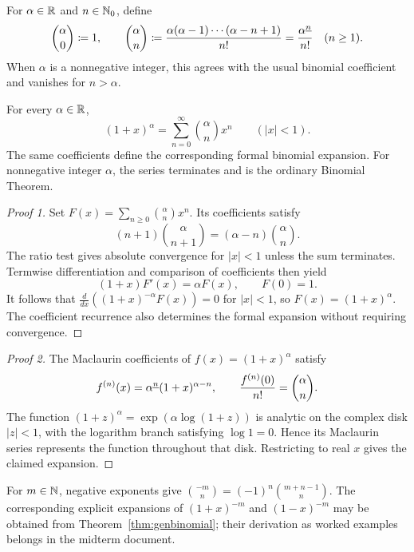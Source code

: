 \documentclass[11pt, oneside]{article}
\begin{document}
\begin{definition}
For $\alpha\in\mathbb{R}$ and $n\in\mathbb{N}_0$, define
\[
\binom\alpha0\coloneqq1, \qquad
\binom\alpha n\coloneqq\frac{\alpha(\alpha-1)\cdots(\alpha-n+1)}{n!}
=\frac{\alpha^{\underline{n}}}{n!}\quad(n\ge1).
\]
When $\alpha$ is a nonnegative integer, this agrees with the usual binomial coefficient and vanishes for $n>\alpha$.
\end{definition}
\begin{theorem}\label{thm:genbinomial}
For every $\alpha\in\mathbb{R}$,
\[
(1+x)^\alpha=\sum_{n=0}^{\infty}\binom\alpha n x^n
\qquad(|x|<1).
\]
The same coefficients define the corresponding formal binomial expansion. For nonnegative integer $\alpha$, the series terminates and is the ordinary Binomial Theorem.
\end{theorem}
\begin{proof}[Proof 1]
Set $F(x)=\displaystyle\sum_{n\ge0}\binom\alpha n x^n$. Its coefficients satisfy
\[
(n+1)\binom\alpha{n+1}=(\alpha-n)\binom\alpha n.
\]
The ratio test gives absolute convergence for $|x|<1$ unless the sum terminates. Termwise differentiation and comparison of coefficients then yield
\[
(1+x)F'(x)=\alpha F(x), \qquad F(0)=1.
\]
It follows that $\frac{d}{dx}((1+x)^{-\alpha}F(x))=0$ for $|x|<1$, so $F(x)=(1+x)^\alpha$. The coefficient recurrence also determines the formal expansion without requiring convergence.
\end{proof}
\begin{proof}[Proof 2]
The Maclaurin coefficients of $f(x)=(1+x)^\alpha$ satisfy
\[
f^{(n)}(x)=\alpha^{\underline{n}} (1+x)^{\alpha-n},
\qquad\frac{f^{(n)}(0)}{n!}=\binom\alpha n.
\]
The function $(1+z)^\alpha=\exp(\alpha\log(1+z))$ is analytic on the complex disk $|z|<1$, with the logarithm branch satisfying $\log 1=0$. Hence its Maclaurin series represents the function throughout that disk. Restricting to real $x$ gives the claimed expansion.
\end{proof}
\begin{remark}
For $m\in\mathbb{N}$, negative exponents give
$\binom{-m}{n}=(-1)^n\binom{m+n-1}{n}$.
The corresponding explicit expansions of $(1+x)^{-m}$ and $(1-x)^{-m}$ may be obtained from Theorem~\ref{thm:genbinomial}; their derivation as worked examples belongs in the midterm document.
\end{remark}
\end{document}
